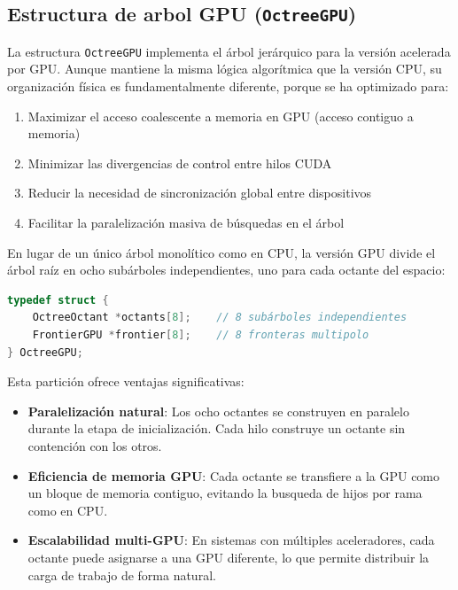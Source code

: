 \subsection{Estructura de arbol GPU (\texttt{OctreeGPU})}\label{subsec:estructura-de-arbol-gpu(texttt{octreegpu})}
La estructura \texttt{OctreeGPU} implementa el árbol jerárquico para la versión acelerada por GPU\@.
Aunque mantiene la misma lógica algorítmica que la versión CPU, su organización física es fundamentalmente diferente, porque se ha optimizado para:
\begin{enumerate}
    \item Maximizar el acceso coalescente a memoria en GPU (acceso contiguo a memoria)
    \item Minimizar las divergencias de control entre hilos CUDA
    \item Reducir la necesidad de sincronización global entre dispositivos
    \item Facilitar la paralelización masiva de búsquedas en el árbol
\end{enumerate}

En lugar de un único árbol monolítico como en CPU, la versión GPU divide el árbol raíz en ocho subárboles independientes, uno para cada octante del espacio:

\begin{lstlisting}[language=C,label={lst:octree_gpu_struct},caption={Estructura OctreeGPU con partición en octantes}]
typedef struct {
    OctreeOctant *octants[8];    // 8 subárboles independientes
    FrontierGPU *frontier[8];    // 8 fronteras multipolo
} OctreeGPU;
\end{lstlisting}

Esta partición ofrece ventajas significativas:

\begin{itemize}
    \item \textbf{Paralelización natural}: Los ocho octantes se construyen en paralelo durante la etapa de inicialización.
    Cada hilo construye un octante sin contención con los otros.

    \item \textbf{Eficiencia de memoria GPU}: Cada octante se transfiere a la GPU como un bloque de memoria contiguo, evitando la busqueda de hijos por rama como en CPU.

    \item \textbf{Escalabilidad multi-GPU}: En sistemas con múltiples aceleradores, cada octante puede asignarse a una GPU diferente, lo que permite distribuir la carga de trabajo de forma natural.

\end{itemize}

